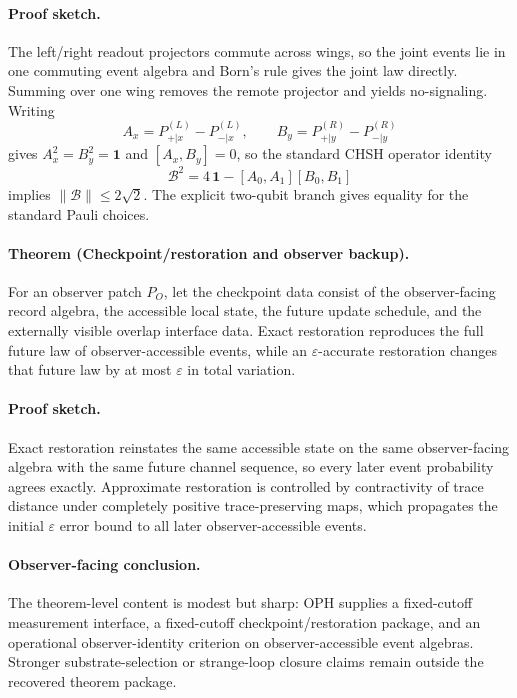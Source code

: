 \paragraph{Proof sketch.}
The left/right readout projectors commute across wings, so the joint events lie in one commuting
event algebra and Born's rule gives the joint law directly. Summing over one wing removes the
remote projector and yields no-signaling. Writing
\[
A_x=P_{+|x}^{(L)}-P_{-|x}^{(L)},
\qquad
B_y=P_{+|y}^{(R)}-P_{-|y}^{(R)}
\]
gives \(A_x^2=B_y^2=\mathbf 1\) and \([A_x,B_y]=0\), so the standard CHSH operator identity
\[
\mathcal B^2=4\,\mathbf 1-[A_0,A_1][B_0,B_1]
\]
implies \(\|\mathcal B\|\le 2\sqrt2\). The explicit two-qubit branch gives equality for the
standard Pauli choices.

\paragraph{Theorem (Checkpoint/restoration and observer backup).}
For an observer patch \(P_O\), let the checkpoint data consist of the observer-facing record
algebra, the accessible local state, the future update schedule, and the externally visible
overlap interface data. Exact restoration reproduces the full future law of observer-accessible
events, while an \(\varepsilon\)-accurate restoration changes that future law by at most
\(\varepsilon\) in total variation.

\paragraph{Proof sketch.}
Exact restoration reinstates the same accessible state on the same observer-facing algebra with
the same future channel sequence, so every later event probability agrees exactly. Approximate
restoration is controlled by contractivity of trace distance under completely positive
trace-preserving maps, which propagates the initial \(\varepsilon\) error bound to all later
observer-accessible events.

\paragraph{Observer-facing conclusion.}
The theorem-level content is modest but sharp: OPH supplies a fixed-cutoff measurement interface,
a fixed-cutoff checkpoint/restoration package, and an operational observer-identity criterion on
observer-accessible event algebras. Stronger substrate-selection or strange-loop closure claims
remain outside the recovered theorem package.

